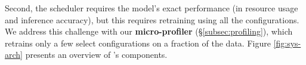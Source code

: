 Second, the scheduler requires the model's exact performance (in resource usage and inference accuracy), but this requires retraining using all the configurations. 
We address this challenge with our {\bf micro-profiler} (\S\ref{subsec:profiling}), which retrains only a few select configurations on 
a fraction of the data. Figure \ref{fig:sys-arch} presents an overview of {\name}'s components. %






%






